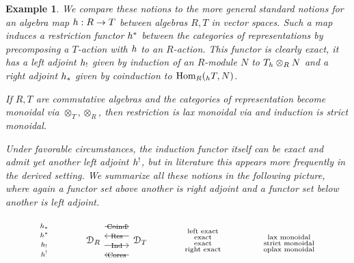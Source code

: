 \documentclass[a4paper, reqno]{amsart}
\newtheorem{example}[theorem]{Example}
\theoremstyle{introTheorems}
\newcommand\Hom{\textup{Hom}}
\renewcommand{\1}{\mathbbold{1}}
\begin{document}
\begin{example}
We compare these notions to the more general standard notions for an algebra map $h:R\to T$ between algebras $R,T$ in vector spaces. Such a map induces a restriction functor $h^*$ between the categories of representations by precomposing a $T$-action with $h$ to an $R$-action. This functor is clearly exact, it has a left adjoint $h_!$ given by induction of an $R$-module $N$ to $T_{h}\otimes_R N$ and a right adjoint $h_*$ given by coinduction to $\Hom_R({_{\fpullback}}T,N)$.

If $R,T$ are commutative algebras and the categories of representation become monoidal via $\otimes_T,\otimes_R$, then restriction is  lax monoidal via and induction is strict monoidal. 

Under favorable circumstances, the induction functor itself can be exact and admit yet another left adjoint $h^!$, but in literature this appears more frequently in the derived setting. We summarize all these notions in the following picture, where again a functor set above another is right adjoint and a functor set below another is left adjoint.

\[\begin{tikzcd}[row sep=6ex, column sep=6ex]
{
\renewcommand{\arraystretch}{0.7}
\begin{array}{c}
    \scriptstyle \fpullback_*\\[.5mm]
    \scriptstyle \fpullback^* \\[.5mm]
    \scriptstyle \fpullback_!\\[.5mm]
    \scriptstyle \fpullback^!
\end{array}
}
&
\catD_R
\arrow[r, rightarrow, shift right=-15pt,"\mathrm{Coind}"{pos=0.5, anchor=center, inner sep=0pt}] 
\arrow[r, leftarrow, shift right=-5pt,"\mathrm{Res}"{pos=0.5, anchor=center, inner sep=0pt}]
\arrow[r,rightarrow, shift right=5pt,"\mathrm{Ind}"{pos=0.5, anchor=center, inner sep=0pt}] 
\arrow[r, leftarrow, shift right=15pt,"\mathrm{Cores}"{pos=0.5, anchor=center, inner sep=0pt}]
& 
\catD_T
&
\begin{array}{c}
    \scriptstyle \textnormal{left exact}\\ [-.2em]
    \scriptstyle \textnormal{exact} \\[-.2em]
    \scriptstyle \textnormal{exact}\\[-.2em]
    \scriptstyle \textnormal{right exact}
\end{array}
&
\begin{array}{c}
    \scriptstyle \textnormal{}\\[-.2em]
    \scriptstyle \textnormal{lax monoidal} \\[-.2em]
    \scriptstyle \textnormal{strict monoidal}\\[-.2em]
    \scriptstyle \textnormal{oplax monoidal}
\end{array}
\end{tikzcd}\]

\end{example}
\end{document}
